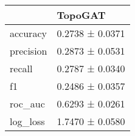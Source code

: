 \begin{tabular}{ll}
\toprule
 & TopoGAT \\
\midrule
accuracy & 0.2738 ± 0.0371 \\
precision & 0.2873 ± 0.0531 \\
recall & 0.2787 ± 0.0340 \\
f1 & 0.2486 ± 0.0357 \\
roc_auc & 0.6293 ± 0.0261 \\
log_loss & 1.7470 ± 0.0580 \\
\bottomrule
\end{tabular}
